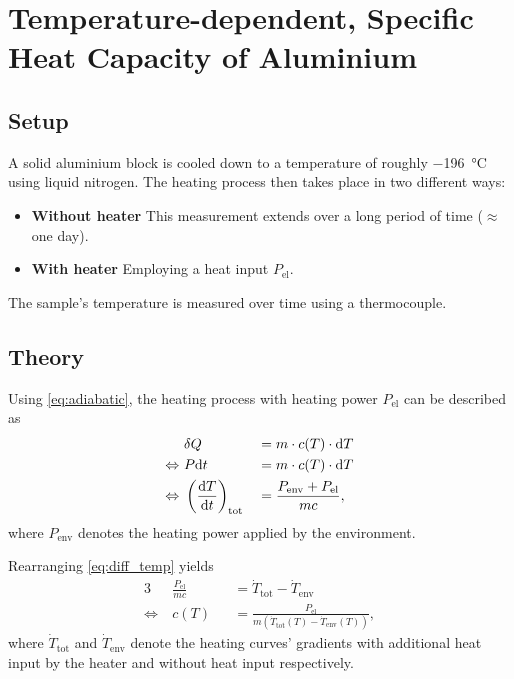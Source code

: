 \chapter{Temperature-dependent, Specific Heat Capacity of Aluminium}
\section{Setup}
A solid aluminium block  is cooled down to a temperature of roughly \SI{-196}{\celsius} using liquid nitrogen.
The heating process then takes place in two different ways:	
\begin{itemize}
	\item \textbf{Without heater} This measurement extends over a long period of time ($\approx$ one day). 
	\item \textbf{With heater} Employing a heat input $P_\text{el}$.	
\end{itemize}
The sample's temperature is measured over time using a thermocouple.

\section{Theory}
Using \autoref{eq:adiabatic}, the heating process with heating power $P_\text{el}$ can be described as
\begin{alignat}{3}
										&\delta Q 																	&&= m\cdot c(T)\cdot\text{d} T \nonumber \\
	\Leftrightarrow\ 	&P\text{d} t																			&&= m\cdot c(T)\cdot\text{d} T \nonumber \\
	\Leftrightarrow\ 	&\left(\frac{\text{d} T}{\text{d} t}\right)_\text{tot}	&&= \frac{P_\text{env}+P_\text{el}}{mc}, \label{eq:diff_temp}
\end{alignat}
where $P_\text{env}$ denotes the heating power applied by the environment.	

Rearranging \autoref{eq:diff_temp} yields
\begin{alignat}{3}
										& \frac{P_\text{el}}{mc}	&&=\dot{T}_\text{tot}-\dot{T}_\text{env} \nonumber \\
	\Leftrightarrow\	& c(T)										&&=\frac{P_\text{el}}{m\left(\dot{T}_\text{tot}(T)-\dot{T}_\text{env}(T)\right)}, \label{eq:cap_temp}
\end{alignat}
where $\dot{T}_\text{tot}$ and $\dot{T}_\text{env}$ denote the heating curves' gradients with additional heat input by the heater and without heat input respectively.

